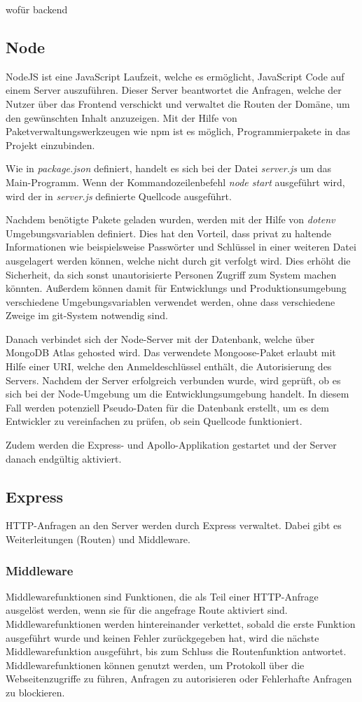wofür backend

\subsection{Node}
NodeJS ist eine JavaScript Laufzeit, welche es ermöglicht, JavaScript Code auf einem Server auszuführen. Dieser Server beantwortet die Anfragen, welche der Nutzer über das Frontend verschickt und verwaltet die Routen der Domäne, um den gewünschten Inhalt anzuzeigen. Mit der Hilfe von Paketverwaltungswerkzeugen wie npm ist es möglich, Programmierpakete in das Projekt einzubinden.

Wie in \textit{package.json} definiert, handelt es sich bei der Datei \textit{server.js} um das Main-Programm. Wenn der Kommandozeilenbefehl \textit{node start} ausgeführt wird, wird der in \textit{server.js} definierte Quellcode ausgeführt.

Nachdem benötigte Pakete geladen wurden, werden mit der Hilfe von \textit{dotenv} Umgebungsvariablen definiert. Dies hat den Vorteil, dass privat zu haltende Informationen wie beispielsweise Passwörter und Schlüssel in einer weiteren Datei ausgelagert werden können, welche nicht durch git verfolgt wird. Dies erhöht die Sicherheit, da sich sonst unautorisierte Personen Zugriff zum System machen könnten. Außerdem können damit für Entwicklungs und Produktionsumgebung verschiedene Umgebungsvariablen verwendet werden, ohne dass verschiedene Zweige im git-System notwendig sind.

Danach verbindet sich der Node-Server mit der Datenbank, welche über MongoDB Atlas gehosted wird. Das verwendete Mongoose-Paket erlaubt mit Hilfe einer URI, welche den Anmeldeschlüssel enthält, die Autorisierung des Servers. Nachdem der Server erfolgreich verbunden wurde, wird geprüft, ob es sich bei der Node-Umgebung um die Entwicklungsumgebung handelt. In diesem Fall werden potenziell Pseudo-Daten für die Datenbank erstellt, um es dem Entwickler zu vereinfachen zu prüfen, ob sein Quellcode funktioniert.

Zudem werden die Express- und Apollo-Applikation gestartet und der Server danach endgültig aktiviert.

\subsection{Express}
HTTP-Anfragen an den Server werden durch Express verwaltet. Dabei gibt es Weiterleitungen (Routen) und Middleware.

\subsubsection{Middleware}
Middlewarefunktionen sind Funktionen, die als Teil einer HTTP-Anfrage ausgelöst werden, wenn sie für die angefrage Route aktiviert sind. Middlewarefunktionen werden hintereinander verkettet, sobald die erste Funktion ausgeführt wurde und keinen Fehler zurückgegeben hat, wird die nächste Middlewarefunktion ausgeführt, bis zum Schluss die Routenfunktion antwortet. Middlewarefunktionen können genutzt werden, um Protokoll über die Webseitenzugriffe zu führen, Anfragen zu autorisieren oder Fehlerhafte Anfragen zu blockieren.

